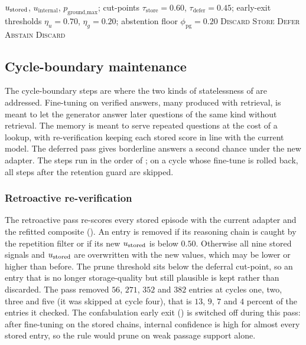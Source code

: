 \begin{algorithm}[!htbp]
\caption[Four-outcome storage decision (Stage~6).]{Four-outcome storage decision (Stage~6).}
\label{alg:decision}
\begin{algorithmic}[1]
\Require $u_{\text{stored}}$, $u_{\text{internal}}$, $p_{\text{ground,max}}$; cut-points $\tau_{\text{store}} = 0.60$, $\tau_{\text{defer}} = 0.45$; early-exit thresholds $\eta_{u} = 0.70$, $\eta_{g} = 0.20$; abstention floor $\phi_{\text{pg}} = 0.20$
    \State \Return \textsc{Discard} 
\EndIf
{} \State \Return \textsc{Store} \EndIf
{} \State \Return \textsc{Defer} \EndIf
{} \State \Return \textsc{Abstain} \EndIf
\State \Return \textsc{Discard}
\end{algorithmic}
\end{algorithm}

\subsection{Cycle-boundary maintenance}
\label{sec:cycle-boundary}

The cycle-boundary steps are where the two kinds of statelessness of  are addressed. Fine-tuning on verified answers, many produced with retrieval, is meant to let the generator answer later questions of the same kind without retrieval. The memory is meant to serve repeated questions at the cost of a lookup, with re-verification keeping each stored score in line with the current model. The deferred pass gives borderline answers a second chance under the new adapter. The steps run in the order of ; on a cycle whose fine-tune is rolled back, all steps after the retention guard are skipped.

\subsubsection{Retroactive re-verification}
\label{sec:retroverify}

The retroactive pass re-scores every stored episode with the current adapter and the refitted composite (). An entry is removed if its reasoning chain is caught by the repetition filter or if its new $u_{\text{stored}}$ is below $0.50$. Otherwise all nine stored signals and $u_{\text{stored}}$ are overwritten with the new values, which may be lower or higher than before. The prune threshold sits below the deferral cut-point, so an entry that is no longer storage-quality but still plausible is kept rather than discarded. The pass removed $56$, $271$, $352$ and $382$ entries at cycles one, two, three and five (it was skipped at cycle four), that is $13$, $9$, $7$ and $4$ percent of the entries it checked. The confabulation early exit () is switched off during this pass: after fine-tuning on the stored chains, internal confidence is high for almost every stored entry, so the rule would prune on weak passage support alone.

